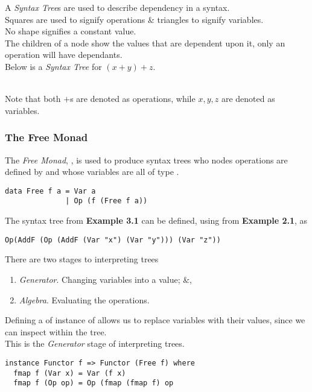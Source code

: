 \documentclass[11pt,a4paper]{article}
\begin{document}
A \textit{Syntax Tree}s are used to describe dependency in a syntax.\\
Squares are used to signify operations \& triangles to signify variables.\\
No shape signifies a constant value.\\
The children of a node show the values that are dependent upon it, only an operation will have dependants.\\

Below is a \textit{Syntax Tree} for $(x+y)+z$.\\
\\
Note that both $+$s are denoted as operations, while $x,y,z$ are denoted as variables.\\

\subsubsection{The Free Monad}

The \textit{Free Monad}, {}, is used to produce syntax trees who nodes operations are defined by {} and whose variables are all of type {}.
\begin{lstlisting}
data Free f a = Var a
              | Op (f (Free f a))
\end{lstlisting}

The syntax tree from \textbf{Example 3.1} can be defined, using {} from \textbf{Example 2.1}, as
\begin{lstlisting}
Op(AddF (Op (AddF (Var "x") (Var "y"))) (Var "z"))
\end{lstlisting}

There are two stages to interpreting {} trees
\begin{enumerate}[label=\roman*)]
	\item \textit{Generator}. Changing variables into a value; \&,
	\item \textit{Algebra}. Evaluating the operations.
\end{enumerate}

Defining a {} of instance of {} allows us to replace variables with their values, since we can inspect within the tree.\\
\NB This is the \textit{Generator} stage of interpreting {} trees.
\begin{lstlisting}
instance Functor f => Functor (Free f) where
  fmap f (Var x) = Var (f x)
  fmap f (Op op) = Op (fmap (fmap f) op
\end{lstlisting}
\end{document}
